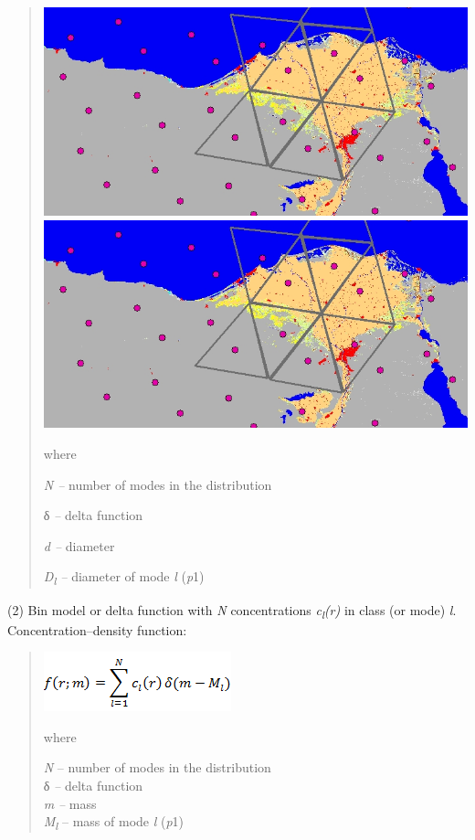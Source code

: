 \begin{quote}
\includegraphics{../tex/extracted-media/media/image13.png}\includegraphics{../tex/extracted-media/media/image13.png}

where

\emph{N --} number of modes in the distribution

δ \emph{--} delta function

\emph{d --} diameter

\emph{D\textsubscript{l} --} diameter of mode \emph{l} (\emph{p}1)
\end{quote}

(2) Bin model or delta function with \emph{N} concentrations \emph{c\textsubscript{l}(r)} in class (or mode) \emph{l}.\\
Concentration--density function:

\begin{quote}
\includegraphics{../tex/extracted-media/media/image14.png}

where

\emph{N} -- number of modes in the distribution\\
δ \emph{--} delta function\\
\emph{m} \emph{--} mass\\
\emph{M\textsubscript{l }}-- mass of mode \emph{l} (\emph{p}1)
\end{quote}


